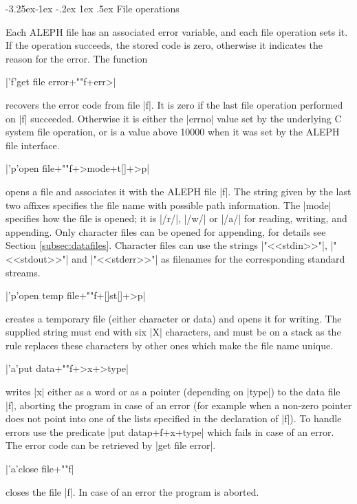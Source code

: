 \documentclass[titlepage]{article}
\makeatletter
\newcommand\A{\textsf{ALEPH}}
\newcommand\g[1]{\textsf{\color{blue!90!black}#1}}
\renewcommand\subsection{%
\@startsection{subsection}{2}{\z@}%
   {-3.25ex\@plus -1ex \@minus -.2ex}%
   {1ex \@plus .5ex}%
   {\normalfont\normalsize\bfseries}}
\makeatother
\begin{document}
\subsection{File operations}

Each \A{} file has an associated error variable, and each file operation sets
it. If the operation succeeds, the stored code is zero, otherwise it
indicates the reason for the error. The function

\pp|'f'get file error+""f+err>|

\noindent
recovers the error code from file \pp|f|. It is zero if the last file
operation performed on \pp|f| succeeded. Otherwise it is either the
\pp|errno| value set by the underlying \textsf{C} system file operation, or
is a value above 10000 when it was set by the \A{} file interface.

\pp|'p'open file+""f+>mode+t[]+>p|

\noindent
opens a file and associates it with the \A{} file \pp|f|. The string given
by the last two affixes specifies the file name with possible path
information. The \pp|mode| specifies how the file is opened; it is \pp|/r/|,
\pp|/w/| or \pp|/a/| for reading, writing, and appending. Only character
files can be opened for appending, for details see Section
\ref{subsec:datafiles}. Character files can use the strings
\pp|"<<stdin>>"|, \pp|"<<stdout>>"| and \pp|"<<stderr>>"| as filenames for
the corresponding standard streams.

\pp|'p'open temp file+""f+[]st[]+>p| 

\noindent
creates a temporary file (either character or data) and opens it for
writing. The supplied string must end with six \pp|X| characters, and must
be on a \g{stack} as the rule replaces these characters by other ones
which make the file name unique.

\pp|'a'put data+""f+>x+>type| 

\noindent
writes \pp|x| either as a word or as a pointer (depending on \pp|type|) to
the data file \pp|f|, aborting the program in case of an error (for example
when a non-zero pointer does not point into one of the lists specified
in the declaration of \pp|f|). To handle errors use the predicate \pp|put
datap+f+x+type| which fails in case of an error. The error code can be
retrieved by \pp|get file error|.

\pp|'a'close file+""f|

\noindent
closes the file \pp|f|. In case of an error the program is aborted. 
\end{document}
